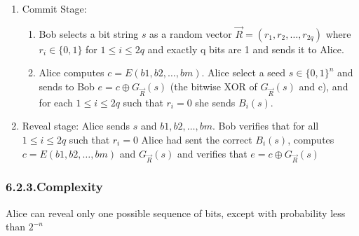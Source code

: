\documentclass{article}
\begin{document}
\begin{enumerate}[noitemsep,topsep=\mdcompacttopsep,label=\Alph*.]%

\item{}Commit Stage:

\begin{enumerate}[noitemsep,topsep=\mdcompacttopsep]%

\item{}Bob selects a bit string $s$ as a random vector $\vec{R} = (r_1, r_2, \dots, r_{2q})$ where $r_i \in \{0, 1\}$
for $1 \leq i \leq 2q$ and exactly q bits are 1 and sends it to Alice.%

\item{}Alice computes $c = E(b1, b2,\dots, bm)$. Alice select a seed $s \in \{0, 1\}^n$
and sends to Bob $e = c \oplus G_{\vec{R}}(s)$  (the bitwise XOR of $G_{\vec{R}}(s)$ and
c), and for each $1 \leq i \leq 2q$ such that $r_i = 0$ she sends $B_i(s)$.%
\end{enumerate}%

\item{}Reveal stage: Alice sends $s$ and $b1, b2,\dots, bm$. Bob verifies that for all
$1 \leq i \leq 2q$ such that $r_i = 0$ Alice had sent the correct $B_i(s)$, computes
$c = E(b1, b2,\dots, bm)$ and $G_{\vec{R}}(s)$ and verifies that $e = c \oplus G_{\vec{R}}(s)$%
\end{enumerate}%

\subsubsection{6.2.3.\hspace*{0.5em}Complexity}\label{sec-complexity}%

\noindent{}Alice can reveal only one possible sequence of bits, except with probability less than $2^{−n}$%
\end{document}
